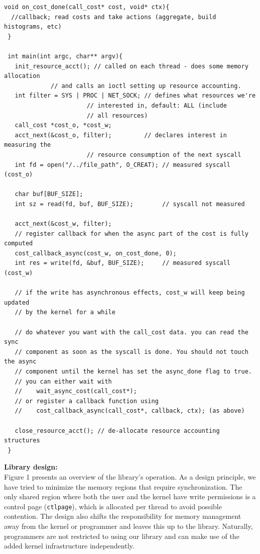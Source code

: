 \documentclass[12pt]{article}
\def\_{\textunderscore\-}
\begin{document}
\vspace{1em}
\lstset{style=customc, captionpos=b}
\begin{lstlisting}[caption=Sample code using the \texttt{rsrcfl} library]
 void on_cost_done(call_cost* cost, void* ctx){
  //callback; read costs and take actions (aggregate, build histograms, etc)
 }

 int main(int argc, char** argv){
   init_resource_acct(); // called on each thread - does some memory allocation
			 // and calls an ioctl setting up resource accounting.
   int filter = SYS | PROC | NET_SOCK; // defines what resources we're
				       // interested in, default: ALL (include
				       // all resources)
   call_cost *cost_o, *cost_w;
   acct_next(&cost_o, filter);         // declares interest in measuring the
				       // resource consumption of the next syscall
   int fd = open("/../file_path", O_CREAT); // measured syscall (cost_o)

   char buf[BUF_SIZE];
   int sz = read(fd, buf, BUF_SIZE);        // syscall not measured

   acct_next(&cost_w, filter);
   // register callback for when the async part of the cost is fully computed
   cost_callback_async(cost_w, on_cost_done, 0);
   int res = write(fd, &buf, BUF_SIZE);     // measured syscall (cost_w)

   // if the write has asynchronous effects, cost_w will keep being updated 
   // by the kernel for a while

   // do whatever you want with the call_cost data. you can read the sync
   // component as soon as the syscall is done. You should not touch the async
   // component until the kernel has set the async_done flag to true.
   // you can either wait with
   //    wait_async_cost(call_cost*);
   // or register a callback function using
   //    cost_callback_async(call_cost*, callback, ctx); (as above)

   close_resource_acct(); // de-allocate resource accounting structures
 }
 \end{lstlisting}
 
\noindent\textbf{Library design:\\}
Figure 1 presents an overview of the library's operation. As a design principle, we have tried to minimize the memory regions that require synchronization. The only shared region where both the user and the kernel have write permissions is a control page (\texttt{ctl\_page}), which is allocated per thread to avoid possible contention.
The design also shifts the responsibility for memory management away from the kernel or programmer and leaves this up to the library.
Naturally, programmers are not restricted to using our library and can make use of the added kernel infrastructure independently.
\end{document}
